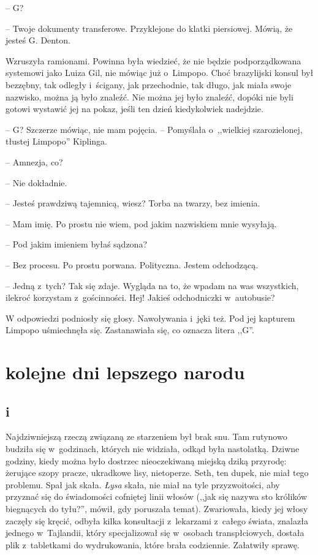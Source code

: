 \documentclass[oneside,polish,11pt,sfheadings]{mwbk}
\begin{document}
-- G?

-- Twoje dokumenty transferowe. Przyklejone do klatki piersiowej. Mówią,
że jesteś G. Denton.

Wzruszyła ramionami. Powinna była wiedzieć, że nie będzie
podporządkowana systemowi jako Luiza Gil, nie mówiąc już o~Limpopo. Choć
brazylijski konsul był bezzębny, tak odległy i~ścigany, jak przechodnie,
tak długo, jak miała swoje nazwisko, można ją było znaleźć. Nie można
jej było znaleźć, dopóki nie byli gotowi wystawić jej na pokaz, jeśli
ten dzień kiedykolwiek nadejdzie.

-- G? Szczerze mówiąc, nie mam pojęcia. -- Pomyślała o~,,wielkiej
szarozielonej, tłustej Limpopo'' Kiplinga.

-- Amnezja, co?

-- Nie dokładnie.

-- Jesteś prawdziwą tajemnicą, wiesz? Torba na twarzy, bez imienia.

-- Mam imię. Po prostu nie wiem, pod jakim nazwiskiem mnie wysyłają.

-- Pod jakim imieniem byłaś sądzona?

-- Bez procesu. Po prostu porwana. Polityczna. Jestem odchodzącą.

-- Jedną z~tych? Tak się zdaje. Wygląda na to, że wpadam na was
wszystkich, ilekroć korzystam z~gościnności. Hej! Jakieś odchodniczki w~autobusie?

W odpowiedzi podniosły się głosy. Nawoływania i~jęki też. Pod jej
kapturem Limpopo uśmiechnęła się. Zastanawiała się, co oznacza litera
,,G''.

\part{kolejne dni lepszego narodu}
\chapter*{i}

Najdziwniejszą rzeczą związaną ze starzeniem był brak snu. Tam rutynowo
budziła się w~godzinach, których nie widziała, odkąd była nastolatką.
Dziwne godziny, kiedy można było dostrzec nieoczekiwaną miejską dziką
przyrodę: żerujące szopy pracze, ukradkowe lisy, nietoperze. Seth, ten
dupek, nie miał tego problemu. Spał jak skała. \textit{Łysa} skała, nie
miał na tyle przyzwoitości, aby przyznać się do świadomości cofniętej
linii włosów (,,jak się nazywa sto królików biegnących do tyłu?'',
mówił, gdy poruszała temat). Zwariowała, kiedy jej włosy zaczęły się
kręcić, odbyła kilka konsultacji z~lekarzami z~całego świata, znalazła
jednego w~Tajlandii, który specjalizował się w~osobach transpłciowych,
dostała plik z~tabletkami do wydrukowania, które brała codziennie.
Załatwiły sprawę.
\end{document}
